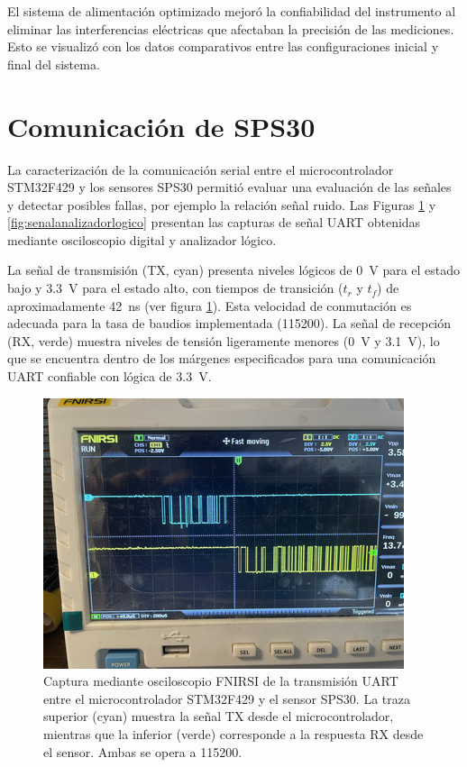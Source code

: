 El sistema de alimentación optimizado mejoró la confiabilidad del instrumento al eliminar las interferencias eléctricas que afectaban la precisión de las mediciones. Esto se visualizó con los datos comparativos entre las configuraciones inicial y final del sistema.


\section{Comunicación de SPS30}


La caracterización de la comunicación serial entre el microcontrolador STM32F429 y los sensores SPS30 permitió evaluar una evaluación de las señales y detectar posibles fallas, por ejemplo la relación señal ruido. Las Figuras \ref{fig:uart_osciloscopio} y \ref{fig:senalanalizadorlogico} presentan las capturas de señal UART obtenidas mediante osciloscopio digital y analizador lógico.

La señal de transmisión (TX, cyan) presenta niveles lógicos de \SI{0}{\volt} para el estado bajo y \SI{3.3}{\volt} para el estado alto, con tiempos de transición (\(t_r\) y \(t_f\)) de aproximadamente \SI{42}{\nano\second} (ver figura \ref{fig:uart_osciloscopio}). Esta velocidad de conmutación es adecuada para la tasa de baudios implementada (\SI{115200}{\baud}). La señal de recepción (RX, verde) muestra niveles de tensión ligeramente menores (\SI{0}{\volt} y \SI{3.1}{\volt}), lo que se encuentra dentro de los márgenes especificados para una comunicación UART confiable con lógica de \SI{3.3}{\volt}.

\begin{figure}[!hp]
	\centering
	\includegraphics[width=0.9\linewidth]{Figures/senal_osciloscopio.png}
	\caption{Captura mediante osciloscopio FNIRSI de la transmisión UART entre el microcontrolador STM32F429 y el sensor SPS30. La traza superior (cyan) muestra la señal TX desde el microcontrolador, mientras que la inferior (verde) corresponde a la respuesta RX desde el sensor. Ambas se opera a \SI{115200}{\baud}.}
	\label{fig:uart_osciloscopio}
\end{figure}

